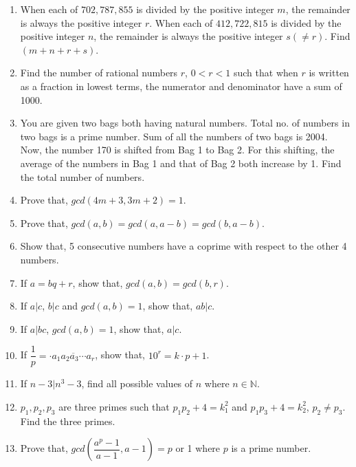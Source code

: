 \documentclass[11pt, a4paper]{article}
\begin{document}
\begin{enumerate}

	\item When each of $702, 787, 855$ is divided by the positive integer $m$, the remainder is always the positive integer $r$. When each of $412, 722, 815$ is divided by the positive integer $n$, the remainder is always the positive integer $s(\neq r)$. Find $(m+n+r+s)$.
	
	\item Find the number of rational numbers $r$, $0 < r < 1$ such that when $r$ is written as a fraction in lowest terms, the numerator and denominator have a sum of 1000.
	
	\item You are given two bags both having natural numbers. Total no. of numbers in two bags is a prime number. Sum of all the numbers of two bags is 2004. Now, the number 170 is shifted from Bag 1 to Bag 2. For this shifting, the average of the numbers in Bag 1 and that of Bag 2 both increase by 1. Find the total number of numbers.
	
	\item Prove that, $gcd(4m+3, 3m+2) = 1$.
	
	\item Prove that, $gcd(a, b) = gcd(a, a-b) = gcd(b, a-b)$.
	
	\item Show that, 5 consecutive numbers have a coprime with respect to the other 4 numbers.
	
	\item If $a = bq + r$, show that, $gcd(a, b) = gcd(b, r)$.
	
	\item If $a|c$, $b|c$ and $gcd(a, b) = 1$, show that, $ab|c$.
	
	\item If $a|bc$, $gcd(a, b) = 1$, show that, $a|c$.
	
	\item If $\dfrac{1}{p} = \cdot \overline{a_1 a_2 a_3 \cdots a_r}$, show that, $10^r = k \cdot p + 1$.
	
	\item If $n-3|n^3-3$, find all possible values of $n$ where $n \in \mathbb{N}$.
	
	\item $p_1, p_2, p_3$ are three primes such that $p_1 p_2 + 4 = k_1^2$ and $p_1 p_3 + 4 = k_2^2$, $p_2 \neq p_3$. Find the three primes.
	
	\item Prove that, $gcd \left(\dfrac{a^p -1}{a - 1}, a-1\right) = p$ or 1 where $p$ is a prime number.
	

\end{enumerate}
\end{document}
